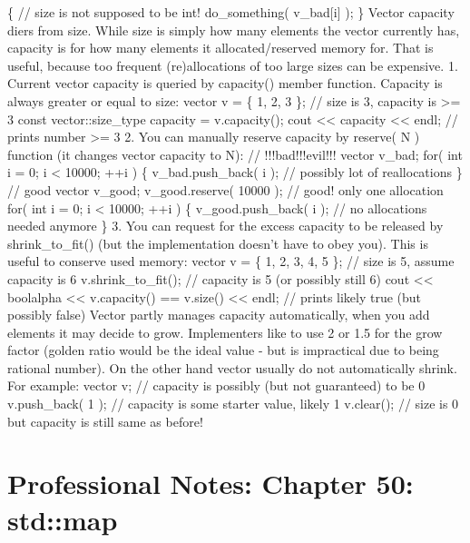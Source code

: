 \{ // size is not supposed to be int! do\_something( v\_bad{[}i{]} ); \}
Vector capacity diers from size. While size is simply how many elements
the vector currently has, capacity is for how many elements it
allocated/reserved memory for. That is useful, because too frequent
(re)allocations of too large sizes can be expensive. 1. Current vector
capacity is queried by capacity() member function. Capacity is always
greater or equal to size: vector v = \{ 1, 2, 3 \}; // size is 3,
capacity is \textgreater= 3 const vector::size\_type capacity =
v.capacity(); cout \textless\textless{} capacity \textless\textless{}
endl; // prints number \textgreater= 3 2. You can manually reserve
capacity by reserve( N ) function (it changes vector capacity to N): //
!!!bad!!!evil!!! vector v\_bad; for( int i = 0; i \textless{} 10000; ++i
) \{ v\_bad.push\_back( i ); // possibly lot of reallocations \} // good
vector v\_good; v\_good.reserve( 10000 ); // good! only one allocation
for( int i = 0; i \textless{} 10000; ++i ) \{ v\_good.push\_back( i );
// no allocations needed anymore \} 3. You can request for the excess
capacity to be released by shrink\_to\_fit() (but the implementation
doesn't have to obey you). This is useful to conserve used memory:
vector v = \{ 1, 2, 3, 4, 5 \}; // size is 5, assume capacity is 6
v.shrink\_to\_fit(); // capacity is 5 (or possibly still 6) cout
\textless\textless{} boolalpha \textless\textless{} v.capacity() ==
v.size() \textless\textless{} endl; // prints likely true (but possibly
false) Vector partly manages capacity automatically, when you add
elements it may decide to grow. Implementers like to use 2 or 1.5 for
the grow factor (golden ratio would be the ideal value - but is
impractical due to being rational number). On the other hand vector
usually do not automatically shrink. For example: vector v; // capacity
is possibly (but not guaranteed) to be 0 v.push\_back( 1 ); // capacity
is some starter value, likely 1 v.clear(); // size is 0 but capacity is
still same as before!

\hypertarget{professional-notes-chapter-50-stdmap-1}{%
\chapter{Professional Notes: Chapter 50:
std::map}\label{professional-notes-chapter-50-stdmap-1}}

